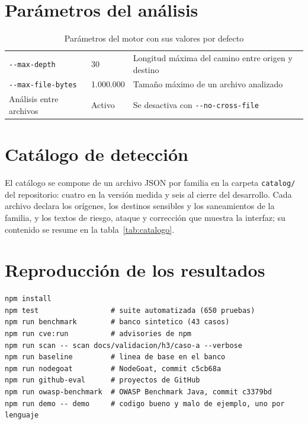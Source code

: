 \section{Parámetros del análisis}

\begin{table}[H]
    \centering
    \caption{Parámetros del motor con sus valores por defecto}
    \label{tab:parametros}
    \small
    \begin{tabularx}{\textwidth}{l l L}
        \toprule
         &  &  \\
        \midrule
        \texttt{-{}-max-depth} & 30 & Longitud máxima del camino entre origen y destino \\
        \texttt{-{}-max-file-bytes} & 1.000.000 & Tamaño máximo de un archivo analizado \\
        Análisis entre archivos & Activo & Se desactiva con \texttt{-{}-no-cross-file} \\
        \bottomrule
    \end{tabularx}
\end{table}

\section{Catálogo de detección}

El catálogo se compone de un archivo JSON por familia en la carpeta
\texttt{catalog/} del repositorio: cuatro en la versión medida y seis al
cierre del desarrollo. Cada archivo declara los orígenes, los destinos
sensibles y los saneamientos de la familia, y los textos de riesgo,
ataque y corrección que muestra la interfaz; su contenido se resume en
la tabla~\ref{tab:catalogo}.

\section{Reproducción de los resultados}

\begin{lstlisting}[caption={Comandos para reproducir las mediciones del capítulo~\ref{cap:resultados}}, label={lst:reproduccion}]
npm install
npm test                 # suite automatizada (650 pruebas)
npm run benchmark        # banco sintetico (43 casos)
npm run cve:run          # advisories de npm
npm run scan -- scan docs/validacion/h3/caso-a --verbose
npm run baseline         # linea de base en el banco
npm run nodegoat         # NodeGoat, commit c5cb68a
npm run github-eval      # proyectos de GitHub
npm run owasp-benchmark  # OWASP Benchmark Java, commit c3379bd
npm run demo -- demo     # codigo bueno y malo de ejemplo, uno por lenguaje
\end{lstlisting}

